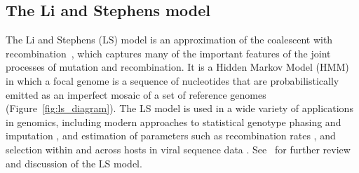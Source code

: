 \documentclass{article}
\begin{document}
\subsection{The Li and Stephens model}
The Li and Stephens (LS) model\citep{Li2003-ib}  is an approximation of the
coalescent with recombination~\citep{Hudson1983-properties}, which captures
many of the important features of the joint processes of mutation and
recombination. It is a Hidden Markov Model (HMM) in which a focal genome is a
sequence of nucleotides that are probabilistically emitted as
an imperfect mosaic of a set of reference genomes
(Figure~\ref{fig:ls_diagram}).
The LS model is used in a wide variety
of applications in genomics, including modern approaches to
statistical genotype phasing and imputation
\citep{Delaneau2019-wl,Browning2021-cg,Browning2018-nk,Rubinacci2020-pa},
and estimation of parameters such as
recombination rates \citep[e.g.][]{Hinch2011-tz},
and selection within and across hosts in viral
sequence data \citep[e.g.][]{Palmer2019-wa}.
See~\cite{Mcvean2019-linkage} for further review and discussion
of the LS model.
\end{document}
